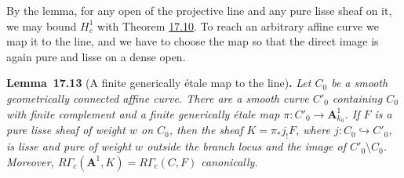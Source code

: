 \documentclass[11pt]{article}
\newenvironment{bpstatement}[2]{\par\addvspace{0.6\baselineskip}\noindent\textbf{#1}#2\textbf{.}\enspace\ignorespaces}
  {\par\addvspace{0.4\baselineskip}}
\newenvironment{bpstatementit}[2]{\begin{bpstatement}{#1}{#2}\itshape\ignorespaces}{\end{bpstatement}}
\begin{document}
\label{bp262}%
By the lemma, for any open of the projective line and any pure lisse sheaf on it, we may bound \(H^1_c\) with Theorem \hyperref[bp252]{17.10}. To reach an arbitrary affine curve we map it to the line, and we have to choose the map so that the direct image is again pure and lisse on a dense open.

\label{bp263}%
\begin{bpstatementit}{Lemma~17.13}{ (A finite generically étale map to the line)}
Let \(C_0\) be a smooth geometrically connected affine curve. There are a smooth curve \(C'_0\) containing \(C_0\) with finite complement and a finite generically étale map \(\pi:C'_0\to\mathbf A^1_{k_0}\). If \(F\) is a pure lisse sheaf of weight \(w\) on \(C_0\), then the sheaf \(K=\pi_*j_!F\), where \(j:C_0\hookrightarrow C'_0\), is lisse and pure of weight \(w\) outside the branch locus and the image of \(C'_0\setminus C_0\). Moreover, \(R\Gamma_c(\mathbf A^1,K)=R\Gamma_c(C,F)\) canonically.
\end{bpstatementit}
\end{document}
